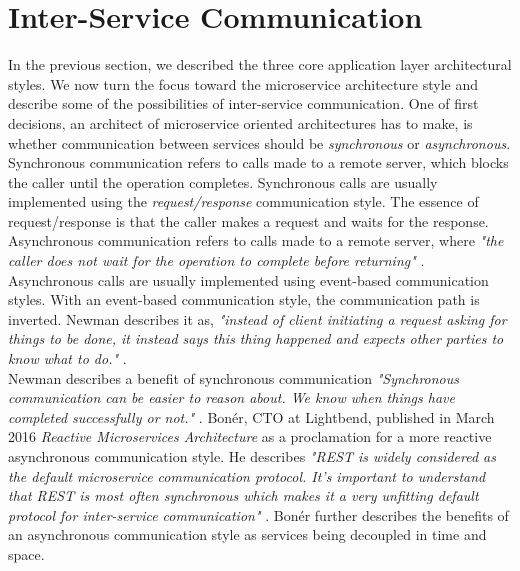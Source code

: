 \section{Inter-Service Communication}
In the previous section, we described the three core application layer architectural styles. We now turn the focus toward the microservice architecture style and describe some of the possibilities of inter-service communication. One of first decisions, an architect of microservice oriented architectures has to make, is whether communication between services should be \textit{synchronous} or \textit{asynchronous}. \\

\noindent
Synchronous communication refers to calls made to a remote server, which blocks the caller until the operation completes. Synchronous calls are usually implemented using the \textit{request/response} communication style. The essence of request/response is that the caller makes a request and waits for the response. \\

\noindent
Asynchronous communication refers to calls made to a remote server, where \textit{"the caller does not wait for the operation to complete before returning"} \cite[p. 42]{newman2015building}. Asynchronous calls are usually implemented using event-based communication styles. With an event-based communication style, the communication path is inverted.  Newman describes it as, \textit{"instead of client initiating a request asking for things to be done, it instead says this thing happened and expects other parties to know what to do."} \cite[p. 43]{newman2015building}. \\

\noindent
Newman describes a benefit of synchronous communication \textit{"Synchronous communication can be easier to reason about. We know when things have completed successfully or not."} \cite[p. 42]{newman2015building}.
Bonér, CTO at Lightbend, published in March 2016 \textit{Reactive Microservices Architecture} as a proclamation for a more reactive asynchronous communication style. He describes \textit{"REST is widely considered as the default microservice communication protocol. It's important to understand that REST is most often synchronous which makes it a very unfitting default protocol for inter-service communication"} \cite[p. 21]{boner2016reactive}. Bonér further describes the benefits of an asynchronous communication style as services being decoupled in time and space. \\


